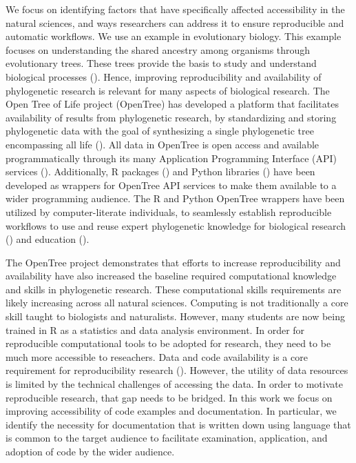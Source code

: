 \documentclass[12pt]{article}
\begin{document}
We focus on identifying factors that have specifically affected accessibility in
the natural sciences, and ways researchers can address it to ensure reproducible
and automatic workflows.
We use an example in evolutionary biology. This example focuses on understanding
the shared ancestry among organisms through evolutionary trees. These
trees provide the basis to study and understand biological processes
(\cite{dobzhansky1973nothing}). Hence, improving reproducibility and availability
of phylogenetic research is relevant for many aspects of biological research.
The Open Tree of Life project (OpenTree) has developed a platform that facilitates
availability of results from phylogenetic research, by standardizing and storing
phylogenetic data with the goal of synthesizing a single phylogenetic tree encompassing
all life (\cite{opentreeoflife2019synth}).
All data in OpenTree is open access and available programmatically through its many
Application Programming Interface (API) services (\cite{opentreeAPIs}).
Additionally, R packages (\cite{michonneau2016rotl}) and Python libraries
(\cite{mctavish2021opentree}) have been developed as wrappers for OpenTree API services
to make them available to a wider programming audience.
The R and Python OpenTree wrappers have been utilized by computer-literate individuals,
to seamlessly establish reproducible workflows to use and reuse expert phylogenetic
knowledge for biological research (\cite{sanchez2019datelife}) and education
(\cite{nguyen2020phylotastic, phylotasticedtools, galacticedtools}).

The OpenTree project demonstrates that efforts to increase reproducibility and availability have also increased the baseline required computational knowledge and skills in phylogenetic research.
These computational skills requirements are likely increasing across all natural sciences.
Computing is not traditionally a core skill taught to biologists and naturalists.
However, many students are now being trained in R as a statistics and data analysis environment.
In order for reproducible computational tools to be adopted for research, they need to be much more accessible to reseachers.
Data and code availability is a core requirement for reproducibility research (\cite{peng2011reproducible, sandve2013ten, powers2019open}).
However, the utility of data resources is limited by the technical challenges of accessing the data.
In order to motivate reproducible research, that gap needs to be bridged.
In this work we focus on improving accessibility of code examples and documentation.
In particular, we identify the necessity for documentation that is written down using language that is common to the target audience to facilitate examination, application, and adoption of code by the wider audience.
\end{document}
